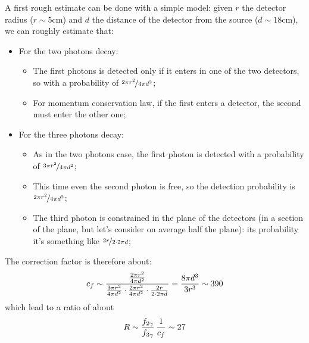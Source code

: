 \documentclass[11pt,a4 paper]{article}
\let\oldfrac\frac
\renewcommand{\frac}[3][d]{\ifthenelse{\equal{#1}{d}}{\oldfrac{#2}{#3}}{\nicefrac{#2}{#3}}}
\begin{document}
A first rough estimate can be done with a simple model: given $r$ the detector radius ($r\sim5\si{\centi\meter}$) and $d$ the distance of the detector from the source ($d\sim18\si{\centi\meter}$), we can roughly estimate that:
\begin{itemize}[noitemsep]
    \item For the two photons decay:
    \begin{itemize}[noitemsep]
        \item The first photons is detected only if it enters in one of the two detectors, so with a probability of $\frac[f]{2\pi r^2}{4\pi d^2}$;
        \item For momentum conservation law, if the first enters a detector, the second must enter the other one;
    \end{itemize}
    \item For the three photons decay:
    \begin{itemize}[noitemsep]
        \item As in the two photons case, the first photon is detected with a probability of $\frac[f]{3 \pi r^2}{4\pi d^2}$;
        \item This time even the second photon is free, so the detection probability is $\frac[f]{2 \pi r^2}{4\pi d^2}$;
        \item The third photon is constrained in the plane of the detectors (in a section of the plane, but let's consider on average half the plane): its probability it's something like  $\frac[f]{2r}{2\cdot2\pi d}$;
    \end{itemize}
\end{itemize}
The correction factor is therefore about:
    \begin{equation}
        c_f \sim \frac{\frac{2 \pi r^2}{4\pi d^2}}{\frac{3 \pi r^2}{4\pi d^2}\cdot\frac{2 \pi r^2}{4\pi d^2}\cdot \frac{2r}{2\cdot2\pi d}} = \frac{8\pi d^3}{3r^3} \sim 390
    \end{equation}
which lead to a ratio of about
\begin{equation}
    R \sim \frac{f_{2\gamma}}{f_{3\gamma}} \,\frac{1}{c_f} \sim 27
\end{equation}


\end{document}
